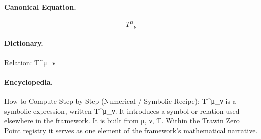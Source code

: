 \paragraph{Canonical Equation.}
\[
T^{\mu}{}_{\nu}
\]

\paragraph{Dictionary.}
Relation: T\textasciicircum{}μ\_ν

\paragraph{Encyclopedia.}
How to Compute Step-by-Step (Numerical / Symbolic Recipe): T\textasciicircum{}μ\_ν is a symbolic expression, written T\textasciicircum{}μ\_ν. It introduces a symbol or relation used elsewhere in the framework. It is built from μ, ν, T. Within the Trawin Zero Point registry it serves as one element of the framework's mathematical narrative.
